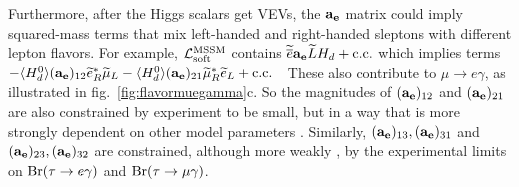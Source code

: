 \documentclass[11pt]{article}
\def\sbar{\overline}
\def\stilde{\widetilde}
\def\lagr{{\cal L}}
\def\conj{{{\rm c.c.}}}
\def\Branching{{\rm Br}}
\begin{document}
Furthermore, after the Higgs scalars get VEVs, the $\bf a_e$ matrix could
imply squared-mass terms that mix left-handed and right-handed sleptons 
with different lepton flavors. For example, $\lagr_{\rm soft}^{\rm MSSM}$
contains ${\stilde{\sbar e}} {\bf a_e} {\stilde L} H_d + \conj$ which
implies terms $ -\langle H_d^0 \rangle ({\bf a_e})_{12} \stilde e_R^*
\stilde \mu_L -\langle H_d^0 \rangle ({\bf a_e})_{21} \stilde \mu_R^*
\stilde e_L + \conj$~~These also contribute to $\mu \rightarrow e \gamma$,
as illustrated in fig.~\ref{fig:flavormuegamma}c.
So the magnitudes of $({\bf a_e})_{12}$ and $({\bf a_e})_{21}$ are also
constrained by experiment to be small, but in a way that is more strongly
dependent on other model parameters \cite{muegammatwo}.  Similarly,
$({\bf a_e})_{13}, ({\bf a_e})_{31}$ and $({\bf a_e})_{23}, ({\bf
a_e})_{32}$ are constrained, although more weakly \cite{flavorreview}, by
the experimental limits on $\Branching (\tau \rightarrow e \gamma)$ and 
$\Branching (\tau \rightarrow \mu \gamma)$. 
\end{document}
